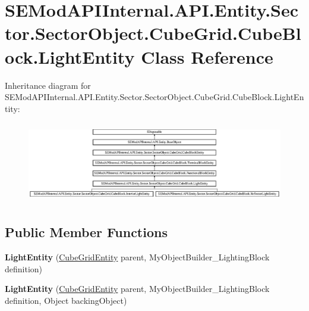 \hypertarget{class_s_e_mod_a_p_i_internal_1_1_a_p_i_1_1_entity_1_1_sector_1_1_sector_object_1_1_cube_grid_1_1_cube_block_1_1_light_entity}{}\section{S\+E\+Mod\+A\+P\+I\+Internal.\+A\+P\+I.\+Entity.\+Sector.\+Sector\+Object.\+Cube\+Grid.\+Cube\+Block.\+Light\+Entity Class Reference}
\label{class_s_e_mod_a_p_i_internal_1_1_a_p_i_1_1_entity_1_1_sector_1_1_sector_object_1_1_cube_grid_1_1_cube_block_1_1_light_entity}
Inheritance diagram for S\+E\+Mod\+A\+P\+I\+Internal.\+A\+P\+I.\+Entity.\+Sector.\+Sector\+Object.\+Cube\+Grid.\+Cube\+Block.\+Light\+Entity\+:\begin{figure}[H]
\begin{center}
\leavevmode
\includegraphics[height=3.570127cm]{class_s_e_mod_a_p_i_internal_1_1_a_p_i_1_1_entity_1_1_sector_1_1_sector_object_1_1_cube_grid_1_1_cube_block_1_1_light_entity}
\end{center}
\end{figure}
\subsection*{Public Member Functions}
\begin{DoxyCompactItemize}
\item 
\hypertarget{class_s_e_mod_a_p_i_internal_1_1_a_p_i_1_1_entity_1_1_sector_1_1_sector_object_1_1_cube_grid_1_1_cube_block_1_1_light_entity_a32184eba7d44647228f6e6ff0de2df5e}{}{\bfseries Light\+Entity} (\hyperlink{class_s_e_mod_a_p_i_internal_1_1_a_p_i_1_1_entity_1_1_sector_1_1_sector_object_1_1_cube_grid_entity}{Cube\+Grid\+Entity} parent, My\+Object\+Builder\+\_\+\+Lighting\+Block definition)\label{class_s_e_mod_a_p_i_internal_1_1_a_p_i_1_1_entity_1_1_sector_1_1_sector_object_1_1_cube_grid_1_1_cube_block_1_1_light_entity_a32184eba7d44647228f6e6ff0de2df5e}

\item 
\hypertarget{class_s_e_mod_a_p_i_internal_1_1_a_p_i_1_1_entity_1_1_sector_1_1_sector_object_1_1_cube_grid_1_1_cube_block_1_1_light_entity_a17143b29745a73d0a31f467c08b73bd5}{}{\bfseries Light\+Entity} (\hyperlink{class_s_e_mod_a_p_i_internal_1_1_a_p_i_1_1_entity_1_1_sector_1_1_sector_object_1_1_cube_grid_entity}{Cube\+Grid\+Entity} parent, My\+Object\+Builder\+\_\+\+Lighting\+Block definition, Object backing\+Object)\label{class_s_e_mod_a_p_i_internal_1_1_a_p_i_1_1_entity_1_1_sector_1_1_sector_object_1_1_cube_grid_1_1_cube_block_1_1_light_entity_a17143b29745a73d0a31f467c08b73bd5}

\end{DoxyCompactItemize}
